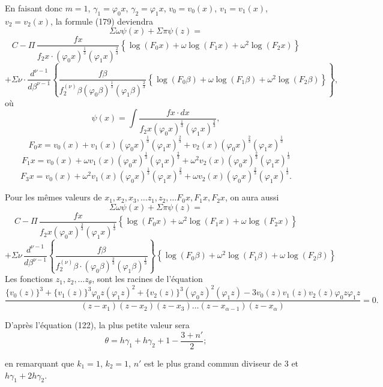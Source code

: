 \documentclass{article}
\begin{document}
En faisant donc $m = 1$, $\gamma_1 = \varphi_0 x$, $\gamma_2 = \varphi_1 x$, $v_0 = v_0(x)$, $v_1 = v_1(x)$, $v_2 = v_2(x)$, la formule (179) deviendra
\[ \Sigma\omega\psi(x)+\Sigma\pi\psi(z) = \]
\[ C-\Pi\,\frac{f x}{f_2 x \cdot (\varphi_0 x)^{\frac{1}{3}}(\varphi_1 x)^{\frac{2}{3}}}\left\{\log(F_0 x)+\omega\log(F_1 x)+\omega^{2}\log(F_2 x)\right\} \]
\[ + \Sigma\nu \cdot \frac{d^{\nu-1}}{d\beta^{\nu-1}} \left\{ \frac{f\beta}{f_2^{(\nu)}\beta(\varphi_0\beta)^{\frac{1}{3}}(\varphi_1\beta)^{\frac{2}{3}}}\left\{\log(F_0\beta)+\omega\log(F_1\beta)+\omega^{2}\log(F_2\beta)\right\} \right\}, \]
où
\[ \psi(x) = \int \frac{f x \cdot dx}{f_2 x(\varphi_0 x)^{\frac{1}{3}}(\varphi_1 x)^{\frac{2}{3}}}, \]
\[ F_0 x = v_0(x)+v_1(x)(\varphi_0 x)^{\frac{1}{3}}(\varphi_1 x)^{\frac{2}{3}}+v_2(x)(\varphi_0 x)^{\frac{2}{3}}(\varphi_1 x)^{\frac{1}{3}} \]
\[ F_1 x = v_0(x)+\omega v_1(x)(\varphi_0 x)^{\frac{1}{3}}(\varphi_1 x)^{\frac{2}{3}}+\omega^{2}v_2(x)(\varphi_0 x)^{\frac{2}{3}}(\varphi_1 x)^{\frac{1}{3}} \]
\[ F_3 x = v_0(x)+\omega^{2}v_1(x)(\varphi_0 x)^{\frac{1}{3}}(\varphi_1 x)^{\frac{2}{3}}+\omega v_2(x)(\varphi_0 x)^{\frac{2}{3}}(\varphi_1 x)^{\frac{1}{3}}. \]

Pour les mêmes valeurs de $x_1, x_2, x_3, \ldots z_1, z_2, \ldots F_0 x, F_1 x, F_2 x$, on aura aussi
\[ \Sigma\omega\psi(x)+\Sigma\pi\psi(z) = \]
\[ C-\Pi\,\frac{f x}{f_2 x(\varphi_0 x)^{\frac{2}{3}}(\varphi_1 x)^{\frac{1}{3}}}\left\{\log(F_0 x)+\omega^{2}\log(F_1 x)+\omega\log(F_2 x)\right\} \]
\[ + \Sigma\nu\,\frac{d^{\nu-1}}{d\beta^{\nu-1}} \left\{ \frac{f\beta}{f_2^{(\nu)}\beta \cdot (\varphi_0\beta)^{\frac{2}{3}}(\varphi_1\beta)^{\frac{1}{3}}} \right\} \left\{\log(F_0\beta)+\omega^{2}\log(F_1\beta)+\omega\log(F_2\beta)\right\} \]
Les fonctions $z_1, z_2, \ldots z_\theta$, sont les racines de l'équation
\[ \frac{\{v_0(z)\}^{3}+\{v_1(z)\}^{3}\varphi_0 z(\varphi_1 z)^{2}+\{v_2(z)\}^{3}(\varphi_0 z)^{2}(\varphi_1 z)-3v_0(z)v_1(z)v_2(z)\varphi_0 z\varphi_1 z}{(z-x_1)(z-x_2)(z-x_3)\ldots(z-x_{\alpha-1})(z-x_\alpha)} = 0. \]

D'après l'équation (122), la plus petite valeur sera
\[ \theta = h\gamma_1+h\gamma_2+1-\frac{3+n'}{2}; \]

en remarquant que $k_1=1$, $k_2=1$, $n'$ est le plus grand commun diviseur de 3 et $h\gamma_1+2h\gamma_2$.
\end{document}
